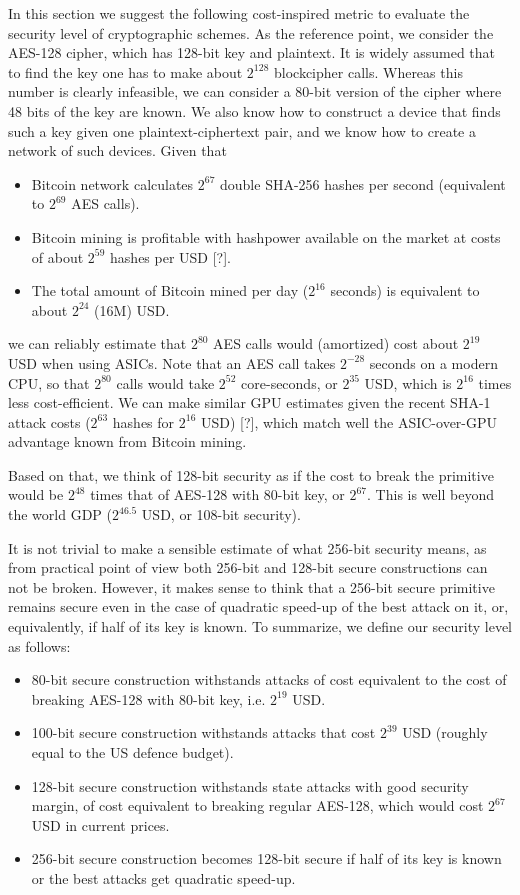 \documentclass[a4paper]{article}
\begin{document}
In this section we suggest the following cost-inspired metric to evaluate the security level of cryptographic schemes. As the reference point, we consider the AES-128 cipher, which has 128-bit key and plaintext. It is widely assumed that to find the key one has to make about $2^{128}$ blockcipher calls. Whereas this number is clearly infeasible, we can consider a 80-bit version of the cipher where 48 bits of the key are known.  We also know how to construct a device that finds such a key given one plaintext-ciphertext pair, and we know how to create a network of such devices.
Given that
\begin{itemize}
    \item Bitcoin network calculates $2^{67}$ double SHA-256 hashes per second (equivalent to $2^{69}$ AES calls).
    \item Bitcoin mining is profitable with hashpower available on the market at costs of about $2^{59}$ hashes per USD [?].
    \item The total amount of Bitcoin mined per day ($2^{16}$ seconds) is equivalent to about $2^{24}$ (16M) USD.
\end{itemize}
we can reliably estimate that $2^{80}$ AES calls would (amortized) cost about  $2^{19}$ USD when using ASICs. Note that an AES call takes $2^{-28}$ seconds on a modern CPU, so that $2^{80}$ calls would take $2^{52}$ core-seconds, or $2^{35}$ USD, which is $2^{16}$ times less cost-efficient. 
We can make similar GPU estimates given the recent SHA-1 attack costs ($2^{63}$ hashes for $2^{16}$ USD) [?], which match well the ASIC-over-GPU advantage known from Bitcoin mining.

Based on that, we think of 128-bit security as if the cost to break the primitive would be $2^{48}$ times that of AES-128 with 80-bit key, or $2^{67}$. This is well beyond the world GDP ($2^{46.5}$ USD, or 108-bit security). 

It is not trivial to make a sensible estimate of what 256-bit security means, as from practical point of view both 256-bit and 128-bit secure constructions can not be broken. However, it makes sense to think that a 256-bit secure primitive remains secure even in the case of quadratic speed-up of the best attack on it, or, equivalently, if half of its key is known. To summarize, we define our security level as follows:
\begin{itemize}
    \item 80-bit secure construction withstands attacks of cost  equivalent to the cost of breaking AES-128 with 80-bit key, i.e. $2^{19}$ USD.
    \item 100-bit secure construction withstands attacks that cost $2^{39}$ USD (roughly equal to the US defence budget).
    \item 128-bit secure construction withstands state attacks with good security margin, of cost equivalent to breaking regular AES-128, which would cost $2^{67}$ USD in current prices.
    \item 256-bit secure construction becomes 128-bit secure if half of its key is known or the best attacks get quadratic speed-up.
\end{itemize}
\end{document}
